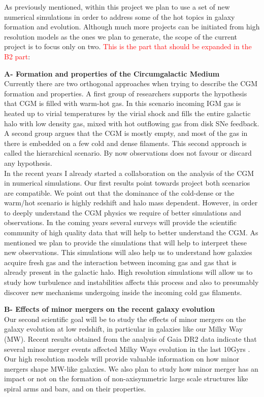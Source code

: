 \documentclass[oneside, a4paper, onecolumn, 11pt]{article}
\begin{document}
As previously mentioned, within this project we plan to use a set of new numerical simulations in order to address some of the hot topics in galaxy formation and evolution. Although much more projects can be initiated from high resolution models as the ones we plan to generate, the scope of the current project is to focus only on two. {\textcolor{red}{This is the part that should be expanded in the B2 part}}:

{\bf A- Formation and properties of the Circumgalactic Medium}\\
 Currently there are two orthogonal approaches when trying to describe the CGM formation and properties. A first group of researchers supports the hypothesis that CGM is filled with warm-hot gas. In this scenario incoming IGM gas is heated up to virial temperatures by the virial shock and fills the entire galactic halo with low density gas, mixed with hot outflowing gas from disk SNe feedback. A second group argues that the CGM is mostly empty, and most of the gas in there is embedded on a few cold and dense filaments. This second approach is called the hierarchical scenario. By now observations does not favour or discard any hypothesis.\\
 In the recent years I already started a collaboration on the analysis of the CGM in numerical simulations. Our first results point towards project both scenarios are compatible. We point out that the dominance of the cold-dense or the warm/hot scenario is highly redshift and halo mass dependent. However, in order to deeply understand the CGM physics we require of better simulations and observations. In the coming years several surveys will provide the scientific community of high quality data that will help to better understand the CGM. As mentioned we plan to provide the simulations that will help to interpret these new observations. This simulations will also help us to understand how galaxies acquire fresh gas and the interaction between incoming gas and gas that is already present in the galactic halo. High resolution simulations will allow us to study how turbulence and instabilities affects this process and also to presumably discover new mechanisms undergoing inside the incoming cold gas filaments.

{\bf B- Effects of minor mergers on the recent galaxy evolution}\\
Our second scientific goal will be to study the effects of minor mergers on the galaxy evolution at low redshift, in particular in galaxies like our Milky Way (MW). Recent results obtained from the analysis of Gaia DR2 data indicate that several minor merger events affected Milky Ways evolution in the last 10Gyrs \citep[e.g.][]{Helmi2018,Mor2019}. Our high resolution models will provide valuable information on how minor mergers shape MW-like galaxies. We also plan to study how minor merger has an impact or not on the formation of non-axisymmetric large scale structures like spiral arms and bars, and on their properties.
\end{document}
